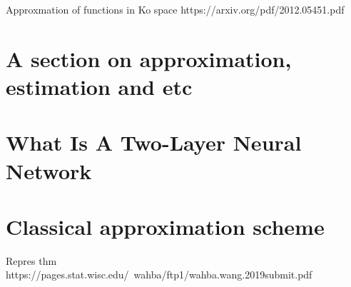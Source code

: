Approxmation of functions in Ko space https://arxiv.org/pdf/2012.05451.pdf

\section{A section on approximation, estimation and etc}

\section{What Is A Two-Layer Neural Network}

\section{Classical approximation scheme}

Repres thm https://pages.stat.wisc.edu/~wahba/ftp1/wahba.wang.2019submit.pdf

